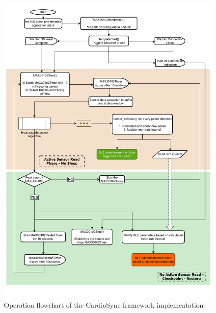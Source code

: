 \begin{figure}[H]
    \centering
    \includegraphics[width=\linewidth]{chapters/Implementation/Flowchart_CardioSync.pdf}
    \caption{Operation flowchart of the CardioSync framework implementation}
    \label{fig:flowchart}
\end{figure}